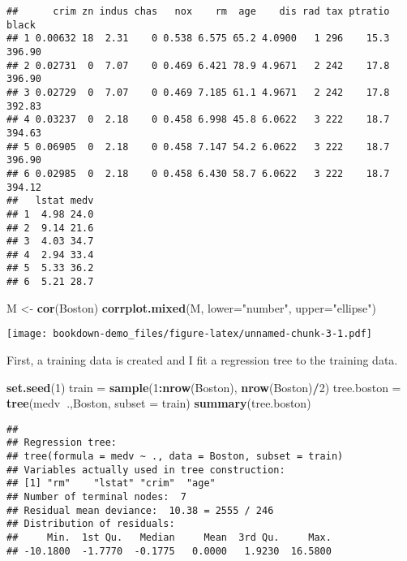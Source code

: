 \documentclass[]{book}
\newenvironment{Shaded}{\begin{snugshade}}{\end{snugshade}}
\newcommand{\DataTypeTok}[1]{\textcolor[rgb]{0.13,0.29,0.53}{#1}}
\newcommand{\DecValTok}[1]{\textcolor[rgb]{0.00,0.00,0.81}{#1}}
\newcommand{\KeywordTok}[1]{\textcolor[rgb]{0.13,0.29,0.53}{\textbf{#1}}}
\newcommand{\NormalTok}[1]{#1}
\newcommand{\OperatorTok}[1]{\textcolor[rgb]{0.81,0.36,0.00}{\textbf{#1}}}
\newcommand{\StringTok}[1]{\textcolor[rgb]{0.31,0.60,0.02}{#1}}
\begin{document}
\begin{verbatim}
##      crim zn indus chas   nox    rm  age    dis rad tax ptratio  black
## 1 0.00632 18  2.31    0 0.538 6.575 65.2 4.0900   1 296    15.3 396.90
## 2 0.02731  0  7.07    0 0.469 6.421 78.9 4.9671   2 242    17.8 396.90
## 3 0.02729  0  7.07    0 0.469 7.185 61.1 4.9671   2 242    17.8 392.83
## 4 0.03237  0  2.18    0 0.458 6.998 45.8 6.0622   3 222    18.7 394.63
## 5 0.06905  0  2.18    0 0.458 7.147 54.2 6.0622   3 222    18.7 396.90
## 6 0.02985  0  2.18    0 0.458 6.430 58.7 6.0622   3 222    18.7 394.12
##   lstat medv
## 1  4.98 24.0
## 2  9.14 21.6
## 3  4.03 34.7
## 4  2.94 33.4
## 5  5.33 36.2
## 6  5.21 28.7
\end{verbatim}

\begin{Shaded}
\begin{Highlighting}[]
\NormalTok{M <-}\StringTok{ }\KeywordTok{cor}\NormalTok{(Boston)}
\KeywordTok{corrplot.mixed}\NormalTok{(M, }\DataTypeTok{lower=}\StringTok{"number"}\NormalTok{, }\DataTypeTok{upper=}\StringTok{"ellipse"}\NormalTok{)}
\end{Highlighting}
\end{Shaded}

\texttt{[image: bookdown-demo\_files/figure-latex/unnamed-chunk-3-1.pdf]}

First, a training data is created and I fit a regression tree to the training data.

\begin{Shaded}
\begin{Highlighting}[]
\KeywordTok{set.seed}\NormalTok{(}\DecValTok{1}\NormalTok{)}
\NormalTok{train =}\StringTok{ }\KeywordTok{sample}\NormalTok{(}\DecValTok{1}\OperatorTok{:}\KeywordTok{nrow}\NormalTok{(Boston), }\KeywordTok{nrow}\NormalTok{(Boston)}\OperatorTok{/}\DecValTok{2}\NormalTok{)}
\NormalTok{tree.boston =}\StringTok{ }\KeywordTok{tree}\NormalTok{(medv}\OperatorTok{~}\NormalTok{.,Boston, }\DataTypeTok{subset =}\NormalTok{ train)}
\KeywordTok{summary}\NormalTok{(tree.boston)}
\end{Highlighting}
\end{Shaded}

\begin{verbatim}
## 
## Regression tree:
## tree(formula = medv ~ ., data = Boston, subset = train)
## Variables actually used in tree construction:
## [1] "rm"    "lstat" "crim"  "age"  
## Number of terminal nodes:  7 
## Residual mean deviance:  10.38 = 2555 / 246 
## Distribution of residuals:
##     Min.  1st Qu.   Median     Mean  3rd Qu.     Max. 
## -10.1800  -1.7770  -0.1775   0.0000   1.9230  16.5800
\end{verbatim}
\end{document}
